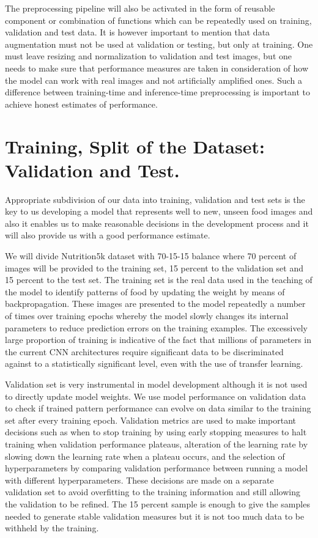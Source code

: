 \documentclass[12pt, openany]{report}
\begin{document}
The preprocessing pipeline will also be activated in the form of reusable component or combination of functions which can be repeatedly used on training, validation and test data. It is however important to mention that data augmentation must not be used at validation or testing, but only at training. One must leave resizing and normalization to validation and test images, but one needs to make sure that performance measures are taken in consideration of how the model can work with real images and not artificially amplified ones. Such a difference between training-time and inference-time preprocessing is important to achieve honest estimates of performance.

\section{Training, Split of the Dataset: Validation and Test.}
Appropriate subdivision of our data into training, validation and test sets is the key to us developing a model that represents well to new, unseen food images and also it enables us to make reasonable decisions in the development process and it will also provide us with a good performance estimate.

We will divide Nutrition5k dataset with 70-15-15 balance where 70 percent of images will be provided to the training set, 15 percent to the validation set and 15 percent to the test set. The training set is the real data used in the teaching of the model to identify patterns of food by updating the weight by means of backpropagation. These images are presented to the model repeatedly a number of times over training epochs whereby the model slowly changes its internal parameters to reduce prediction errors on the training examples. The excessively large proportion of training is indicative of the fact that millions of parameters in the current CNN architectures require significant data to be discriminated against to a statistically significant level, even with the use of transfer learning.

Validation set is very instrumental in model development although it is not used to directly update model weights. We use model performance on validation data to check if trained pattern performance can evolve on data similar to the training set after every training epoch. Validation metrics are used to make important decisions such as when to stop training by using early stopping measures to halt training when validation performance plateaus, alteration of the learning rate by slowing down the learning rate when a plateau occurs, and the selection of hyperparameters by comparing validation performance between running a model with different hyperparameters. These decisions are made on a separate validation set to avoid overfitting to the training information and still allowing the validation to be refined. The 15 percent sample is enough to give the samples needed to generate stable validation measures but it is not too much data to be withheld by the training.
\end{document}
